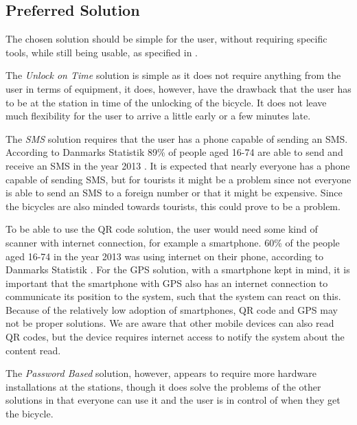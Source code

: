 \subsection{Preferred Solution}
The chosen solution should be simple for the user, without requiring specific tools, while still being usable, as specified in .

The \textit{Unlock on Time} solution is simple as it does not require anything from the user in terms of equipment, it does, however, have the drawback that the user has to be at the station in time of the unlocking of the bicycle.
It does not leave much flexibility for the user to arrive a little early or a few minutes late.

The \textit{SMS} solution requires that the user has a phone capable of sending an SMS. 
According to Danmarks Statistik 89\% of people aged 16-74 are able to send and receive an SMS in the year 2013 \citep{misc:dstMobilephone}.
It is expected that nearly everyone has a phone capable of sending SMS, but for tourists it might be a problem since not everyone is able to send an SMS to a foreign number or that it might be expensive.
Since the bicycles are also minded towards tourists, this could prove to be a problem.

To be able to use the QR code solution, the user would need some kind of scanner with internet connection, for example a smartphone.
60\% of the people aged 16-74 in the year 2013 was using internet on their phone, according to Danmarks Statistik \citep{misc:dstMobilephone}.
For the GPS solution, with a smartphone kept in mind, it is important that the smartphone with GPS also has an internet connection to communicate its position to the system, such that the system can react on this.
Because of the relatively low adoption of smartphones, QR code and GPS may not be proper solutions.
We are aware that other mobile devices can also read QR codes, but the device requires internet access to notify the system about the content read.

The \textit{Password Based} solution, however, appears to require more hardware installations at the stations, though it does solve the problems of the other solutions in that everyone can use it and the user is in control of when they get the bicycle.